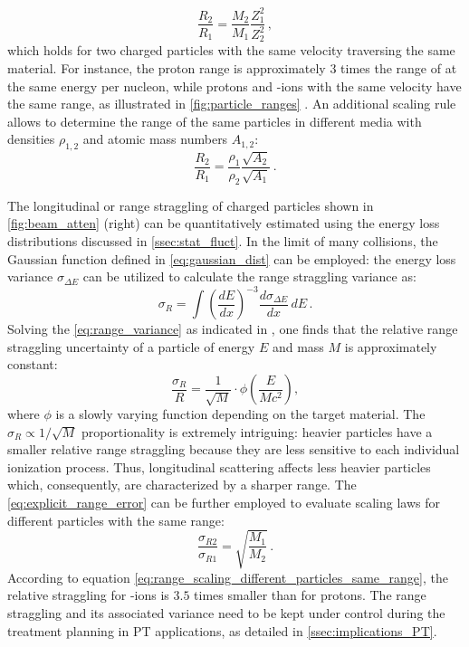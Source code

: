 \begin{equation}
	\frac{R_2}{R_1}=\frac{M_2}{M_1}\frac{Z_1^2}{Z_2^2}\,,
	\label{eq:range_scaling_different_particles}
\end{equation}
which holds for two charged particles with the same velocity traversing the same material. For instance, the proton range is approximately $3$ times the range of  at the same energy per nucleon, while protons and -ions with the same velocity have the same range, as illustrated in \autoref{fig:particle_ranges} \cite{Durante_2016}. An additional scaling rule allows to determine the range of the same particles in different media with densities $\rho_{1,2}$ and atomic mass numbers $A_{1,2}$:
\begin{equation}
	\frac{R_2}{R_1}=\frac{\rho_1}{\rho_2}\frac{\sqrt{A_2}}{\sqrt{A_1}}\,.
	\label{eq:range_scaling_same_particles}
\end{equation}

The longitudinal or range straggling of charged particles shown in \autoref{fig:beam_atten} (right) can be quantitatively estimated using the energy loss distributions discussed in \autoref{ssec:stat_fluct}. In the limit of many collisions, the Gaussian function defined in \autoref{eq:gaussian_dist} can be employed: the energy loss variance $\sigma_{\Delta E}$ can be utilized to calculate the range straggling variance as:
\begin{equation}
	\sigma_R=\int\left(\frac{dE}{dx}\right)^{-3}\frac{d\sigma_{\Delta E}}{dx}\,dE\,.
	\label{eq:range_variance}
\end{equation}
Solving the \autoref{eq:range_variance} as indicated in \cite{1969PhRv..185..611P}, one finds that the relative range straggling uncertainty of a particle of energy $E$ and mass $M$ is approximately constant:
\begin{equation}
	\frac{\sigma_R}{R}=\frac{1}{\sqrt{M}}\cdot\phi\left(\frac{E}{Mc^2}\right),
	\label{eq:explicit_range_error}
\end{equation}
where $\phi$ is a slowly varying function depending on the target material. The $\sigma_R\propto1/\sqrt{M}$ proportionality is extremely intriguing: heavier particles have a smaller relative range straggling because they are less sensitive to each individual ionization process. Thus, longitudinal scattering affects less heavier particles which, consequently, are characterized by a sharper range. The \autoref{eq:explicit_range_error} can be further employed to evaluate scaling laws for different particles with the same range:
\begin{equation}
	\frac{\sigma_{R2}}{\sigma_{R1}}=\sqrt{\frac{M_1}{M_2}}\,.
	\label{eq:range_scaling_different_particles_same_range}
\end{equation}
According to equation \autoref{eq:range_scaling_different_particles_same_range}, the relative straggling for -ions is $3.5$ times smaller than for protons. The range straggling and its associated variance need to be kept under control during the treatment planning in PT applications, as detailed in \autoref{ssec:implications_PT}.
